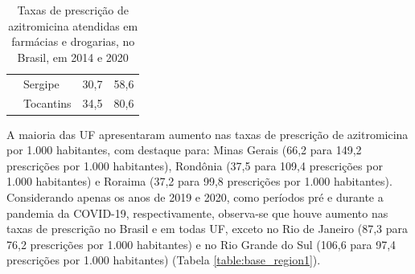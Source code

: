 \begin{table}[!htbp]
\begin{tabular}{llrr}
                      & Sergipe                              & 30,7                       & 58,6                       \\
                      & Tocantins                            & 34,5                       & 80,6                       \\ \hline
    \end{tabular}
    \caption{Taxas de prescrição de azitromicina atendidas em farmácias e drogarias, no Brasil, em 2014 e 2020}
    \label{table:base_region}
    \end{table}

    A maioria das UF apresentaram aumento nas taxas de prescrição de azitromicina por 1.000 habitantes, com destaque para: Minas Gerais (66,2 para 149,2 prescrições por 1.000 habitantes), Rondônia (37,5 para 109,4 prescrições por 1.000 habitantes) e Roraima (37,2 para 99,8 prescrições por 1.000 habitantes).
Considerando apenas os anos de 2019 e 2020, como períodos pré e durante a pandemia da COVID-19, respectivamente, observa-se que houve aumento nas taxas de prescrição no Brasil e em todas UF, exceto no Rio de Janeiro (87,3 para 76,2 prescrições por 1.000 habitantes) e no Rio Grande do Sul (106,6 para 97,4 prescrições por 1.000 habitantes) (Tabela \ref{table:base_region1}).
